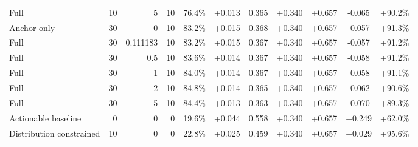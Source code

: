 \begin{table}[htbp]
\begin{tabular}{lrrrccccccc}
Full & 10 & 5 & 10 & 76.4\% & +0.013 & 0.365 & +0.340 & +0.657 & -0.065 & +90.2\% \\
Anchor only & 30 & 0 & 10 & 83.2\% & +0.015 & 0.368 & +0.340 & +0.657 & -0.057 & +91.3\% \\
Full & 30 & 0.111183 & 10 & 83.2\% & +0.015 & 0.367 & +0.340 & +0.657 & -0.057 & +91.2\% \\
Full & 30 & 0.5 & 10 & 83.6\% & +0.014 & 0.367 & +0.340 & +0.657 & -0.058 & +91.2\% \\
Full & 30 & 1 & 10 & 84.0\% & +0.014 & 0.367 & +0.340 & +0.657 & -0.058 & +91.1\% \\
Full & 30 & 2 & 10 & 84.8\% & +0.014 & 0.365 & +0.340 & +0.657 & -0.062 & +90.6\% \\
Full & 30 & 5 & 10 & 84.4\% & +0.013 & 0.363 & +0.340 & +0.657 & -0.070 & +89.3\% \\
Actionable baseline & 0 & 0 & 0 & 19.6\% & +0.044 & 0.558 & +0.340 & +0.657 & +0.249 & +62.0\% \\
Distribution constrained & 10 & 0 & 0 & 22.8\% & +0.025 & 0.459 & +0.340 & +0.657 & +0.029 & +95.6\% \\
\bottomrule
\end{tabular}
\end{table}